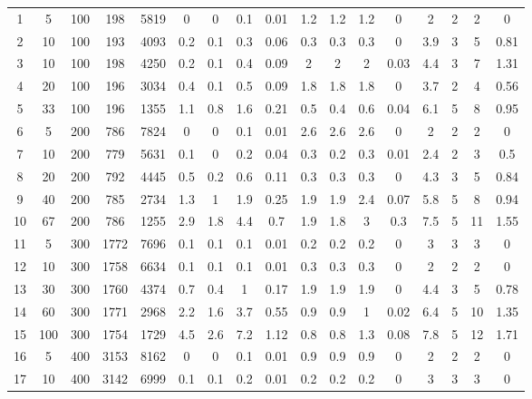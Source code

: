 \documentclass[11pt]{article}
\begin{document}
\begin{appendices}
\begin{landscape}
\begin{longtable}[c]{ccccc|cccc|cccc|cccc}
				\endhead
				\rowcolor[HTML]{EFEFEF} 
				1 & 5 & 100 & 198 & 5819 & 0 & 0 & 0.1 & 0.01 & 1.2 & 1.2 & 1.2 & 0 & 2 & 2 & 2 & 0 \\
				\rowcolor[HTML]{EFEFEF} 
				2 & 10 & 100 & 193 & 4093 & 0.2 & 0.1 & 0.3 & 0.06 & 0.3 & 0.3 & 0.3 & 0 & 3.9 & 3 & 5 & 0.81 \\
				\rowcolor[HTML]{EFEFEF} 
				3 & 10 & 100 & 198 & 4250 & 0.2 & 0.1 & 0.4 & 0.09 & 2 & 2 & 2 & 0.03 & 4.4 & 3 & 7 & 1.31 \\
				\rowcolor[HTML]{EFEFEF} 
				4 & 20 & 100 & 196 & 3034 & 0.4 & 0.1 & 0.5 & 0.09 & 1.8 & 1.8 & 1.8 & 0 & 3.7 & 2 & 4 & 0.56 \\
				\rowcolor[HTML]{EFEFEF} 
				5 & 33 & 100 & 196 & 1355 & 1.1 & 0.8 & 1.6 & 0.21 & 0.5 & 0.4 & 0.6 & 0.04 & 6.1 & 5 & 8 & 0.95 \\
				6 & 5 & 200 & 786 & 7824 & 0 & 0 & 0.1 & 0.01 & 2.6 & 2.6 & 2.6 & 0 & 2 & 2 & 2 & 0 \\
				7 & 10 & 200 & 779 & 5631 & 0.1 & 0 & 0.2 & 0.04 & 0.3 & 0.2 & 0.3 & 0.01 & 2.4 & 2 & 3 & 0.5 \\
				8 & 20 & 200 & 792 & 4445 & 0.5 & 0.2 & 0.6 & 0.11 & 0.3 & 0.3 & 0.3 & 0 & 4.3 & 3 & 5 & 0.84 \\
				9 & 40 & 200 & 785 & 2734 & 1.3 & 1 & 1.9 & 0.25 & 1.9 & 1.9 & 2.4 & 0.07 & 5.8 & 5 & 8 & 0.94 \\
				10 & 67 & 200 & 786 & 1255 & 2.9 & 1.8 & 4.4 & 0.7 & 1.9 & 1.8 & 3 & 0.3 & 7.5 & 5 & 11 & 1.55 \\
				\rowcolor[HTML]{EFEFEF} 
				11 & 5 & 300 & 1772 & 7696 & 0.1 & 0.1 & 0.1 & 0.01 & 0.2 & 0.2 & 0.2 & 0 & 3 & 3 & 3 & 0 \\
				\rowcolor[HTML]{EFEFEF} 
				12 & 10 & 300 & 1758 & 6634 & 0.1 & 0.1 & 0.1 & 0.01 & 0.3 & 0.3 & 0.3 & 0 & 2 & 2 & 2 & 0 \\
				\rowcolor[HTML]{EFEFEF} 
				13 & 30 & 300 & 1760 & 4374 & 0.7 & 0.4 & 1 & 0.17 & 1.9 & 1.9 & 1.9 & 0 & 4.4 & 3 & 5 & 0.78 \\
				\rowcolor[HTML]{EFEFEF} 
				14 & 60 & 300 & 1771 & 2968 & 2.2 & 1.6 & 3.7 & 0.55 & 0.9 & 0.9 & 1 & 0.02 & 6.4 & 5 & 10 & 1.35 \\
				\rowcolor[HTML]{EFEFEF} 
				15 & 100 & 300 & 1754 & 1729 & 4.5 & 2.6 & 7.2 & 1.12 & 0.8 & 0.8 & 1.3 & 0.08 & 7.8 & 5 & 12 & 1.71 \\
				16 & 5 & 400 & 3153 & 8162 & 0 & 0 & 0.1 & 0.01 & 0.9 & 0.9 & 0.9 & 0 & 2 & 2 & 2 & 0 \\
				17 & 10 & 400 & 3142 & 6999 & 0.1 & 0.1 & 0.2 & 0.01 & 0.2 & 0.2 & 0.2 & 0 & 3 & 3 & 3 & 0 \\

\end{longtable}
\end{landscape}
\end{appendices}
\end{document}
